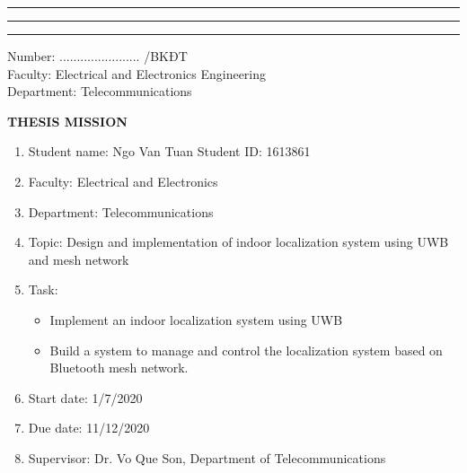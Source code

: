 \documentclass[\main/main.tex]{subfiles}
\begin{document}
\graphicspath{{imgs/}{00_misc/imgs/}}


\rule{\textwidth}{1pt}
\begin{minipage}{0.45\textwidth}
    \vspace{3mm}
    \begin{center}
        \fontsize{7}{12}\selectfont{VIETNAM NATIONAL UNIVERSITY HO CHI MINH CITY\\
                 HO CHI MINH CITY UNIVERSITY OF TECHNOLOGY\\}
    \rule{\textwidth}{1pt}
    \end{center}
\end{minipage}
\hfill
\begin{minipage}{0.45\textwidth}
    \vspace{3mm}
    \begin{center}
        \fontsize{7}{12}\selectfont{SOCIALIST REPUBLIC OF VIETNAM\\
    INDEPENDENCE-FREEDOM-HAPPINESS\\}
    \rule{\textwidth}{1pt}
    \end{center}
\end{minipage}

\begin{flushleft}
    \parbox[t][1.5cm]{10cm}
    {
        Number: ....................... /BKĐT \\
        Faculty: Electrical and Electronics Engineering \\
        Department: Telecommunications
    }
\end{flushleft}

\vspace{3mm}
\begin{center}
    \textbf{THESIS MISSION}
\end{center}
\vspace{3mm}

\begin{enumerate}
    \item Student name: Ngo Van Tuan \hspace{3cm} Student ID: 1613861
    \item Faculty: Electrical and Electronics
    \item Department: Telecommunications
    \item Topic: Design and implementation of indoor localization system using UWB and mesh network 
    \item Task: \begin{itemize}
        \item Implement an indoor localization system using UWB
        \item Build a system to manage and control the localization system based on Bluetooth mesh network.
    \end{itemize}
    \item Start date: 1/7/2020
    \item Due date: 11/12/2020
    \item Supervisor: Dr. Vo Que Son, Department of Telecommunications
\end{enumerate}
\end{document}
